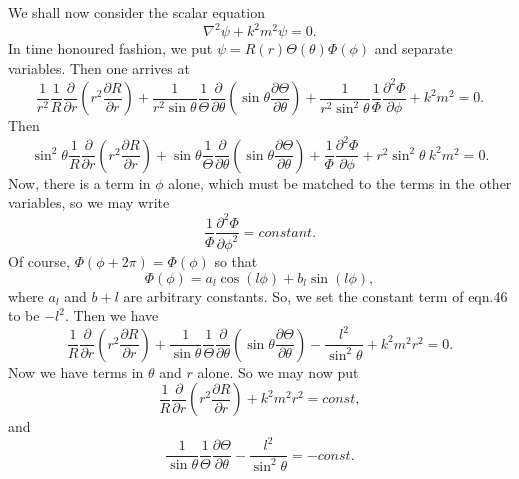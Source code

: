 We shall now consider the scalar equation
\begin{equation}
\nabla^2 \psi +k^2 m^2 \psi=0.
\end{equation}
In time honoured fashion, we put $\psi= R(r) \Theta(\theta)\Phi(\phi)$ and separate variables.
Then one arrives at
\begin{equation}
\frac{1}{r^2} \frac{1}{R} \frac{\partial}{\partial r} \left ( r^2 \frac{\partial R}{\partial r} \right )
+ \frac{1}{r^2 \sin \theta} \frac{1}{\Theta} \frac{\partial}{\partial \theta}
\left ( \sin \theta \frac{\partial \Theta}{ \partial \theta} \right )
+\frac{1}{r^2 \sin^2 \theta} \frac{1}{\Phi} \frac{\partial^2 \Phi}{\partial \phi}+k^2 m^2=0.
\end{equation}
Then
\begin{equation}
\sin^2 \theta \frac{1}{R} \frac{\partial}{\partial r} \left ( r^2 \frac{\partial R}{\partial r} \right )
+  \sin \theta \frac{1}{\Theta} \frac{\partial}{\partial \theta}
\left ( \sin \theta \frac{\partial \Theta}{ \partial \theta} \right )
+ \frac{1}{\Phi} \frac{\partial^2 \Phi}{\partial \phi}+r^2 \sin^2 \theta \> k^2 m^2=0.
\end{equation}
Now, there is a term in $\phi$ alone, which must be matched to the terms in
the other variables, so we may write
\begin{equation}
\frac{1}{\Phi} \frac{ \partial^2 \Phi}{\partial \phi^2}=constant.
\end{equation}
Of course, $\Phi(\phi+2 \pi)=\Phi(\phi)$ so that 
\begin{equation}
\Phi(\phi)=a_l \cos( l \phi)+b_l \sin(l \phi),
\end{equation}
where $a_l$ and $b+l$ are arbitrary constants. So, we set the constant term of eqn.46 to be $-l^2$. Then we have
\begin{equation}
 \frac{1}{R} \frac{\partial}{\partial r} \left ( r^2 \frac{\partial R}{\partial r} \right )
+ \frac{1}{\sin \theta} \frac{1}{\Theta} \frac{\partial}{\partial \theta}
\left ( \sin \theta \frac{\partial \Theta}{ \partial \theta} \right )
-\frac{l^2}{ \sin^2 \theta} +k^2 m^2 r^2=0.
\end{equation}
Now we have terms in $\theta$ and $r$ alone. So we may now put
\begin{equation}
 \frac{1}{R} \frac{\partial}{\partial r} \left ( r^2 \frac{\partial R}{\partial r} \right )
 +k^2 m^2 r^2=const,
\end{equation}
and
\begin{equation}
 \frac{1}{\sin \theta} \frac{1}{\Theta} \frac{\partial \Theta}{\partial \theta}
-\frac{l^2}{ \sin^2 \theta} =-const.
\end{equation}
